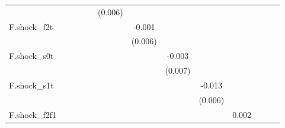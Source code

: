 {\begin{tabular}{l*{12}{c}}
            &                     &                     &                     &                     &     (0.006)         &                     &                     &                     &                     &                     &                     &                     \\
\addlinespace
F.shock\_f2t &                     &                     &                     &                     &                     &      -0.001         &                     &                     &                     &                     &                     &                     \\
            &                     &                     &                     &                     &                     &     (0.006)         &                     &                     &                     &                     &                     &                     \\
\addlinespace
F.shock\_s0t &                     &                     &                     &                     &                     &                     &      -0.003         &                     &                     &                     &                     &                     \\
            &                     &                     &                     &                     &                     &                     &     (0.007)         &                     &                     &                     &                     &                     \\
\addlinespace
F.shock\_s1t &                     &                     &                     &                     &                     &                     &                     &      -0.013\sym{**} &                     &                     &                     &                     \\
            &                     &                     &                     &                     &                     &                     &                     &     (0.006)         &                     &                     &                     &                     \\
\addlinespace
F.shock\_f2f1&                     &                     &                     &                     &                     &                     &                     &                     &       0.002         &                     &                     &                     \\

\end{tabular}}
